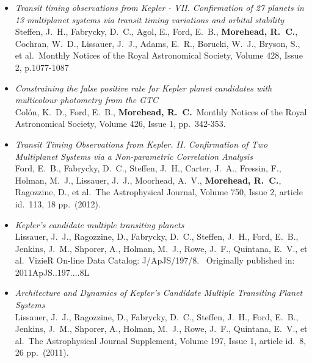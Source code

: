 \documentclass[12pt,letterpaper,sans]{moderncv} %
\begin{document}
\begin{itemize}
 \item \emph{ Transit timing observations from Kepler - VII. Confirmation 
of 27 planets in 13 multiplanet systems via transit timing variations and 
orbital stability } \\ Steffen, J.~H., Fabrycky, D.~C., Agol, E., Ford, 
E.~B., \textbf{Morehead, R.~C.}, Cochran, W.~D., Lissauer, J.~J., Adams, E.~R., 
Borucki, W.~J., Bryson, S., et al.\ Monthly Notices of the Royal 
Astronomical Society, Volume 428, Issue 2, p.1077-1087 \\ 

 \item \emph{ Constraining the false positive rate for Kepler planet 
candidates with multicolour photometry from the GTC } \\ Col{\'o}n, K.~D., 
Ford, E.~B., \textbf{Morehead, R.~C.}\ Monthly Notices of the Royal Astronomical 
Society, Volume 426, Issue 1, pp.~342-353.\ \\ 


 \item \emph{ Transit Timing Observations from Kepler. II. Confirmation 
of Two Multiplanet Systems via a Non-parametric Correlation Analysis } \\ 
Ford, E.~B., Fabrycky, D.~C., Steffen, J.~H., Carter, J.~A., Fressin, F., 
Holman, M.~J., Lissauer, J.~J., Moorhead, A.~V., \textbf{Morehead, R.~C.}, 
Ragozzine, D., et al.\ The Astrophysical Journal, Volume 750, Issue 2, 
article id.~113, 18 pp.~(2012).\ \\ 


 \item \emph{ Kepler's candidate multiple transiting planets} \\ Lissauer, J.~J., Ragozzine, D., Fabrycky, D.~C., Steffen, J.~H., 
Ford, E.~B., Jenkins, J.~M., Shporer, A., Holman, M.~J., Rowe, J.~F., 
Quintana, E.~V., et al.\ VizieR On-line Data Catalog: J/ApJS/197/8.~ 
Originally published in: 2011ApJS..197....8L \\ 

 \item \emph{ Architecture and Dynamics of Kepler's Candidate Multiple 
Transiting Planet Systems } \\ Lissauer, J.~J., Ragozzine, D., Fabrycky, 
D.~C., Steffen, J.~H., Ford, E.~B., Jenkins, J.~M., Shporer, A., Holman, 
M.~J., Rowe, J.~F., Quintana, E.~V., et al.\ The Astrophysical Journal 
Supplement, Volume 197, Issue 1, article id.~8, 26 pp.~(2011).\ \\ 


\end{itemize}
\end{document}
